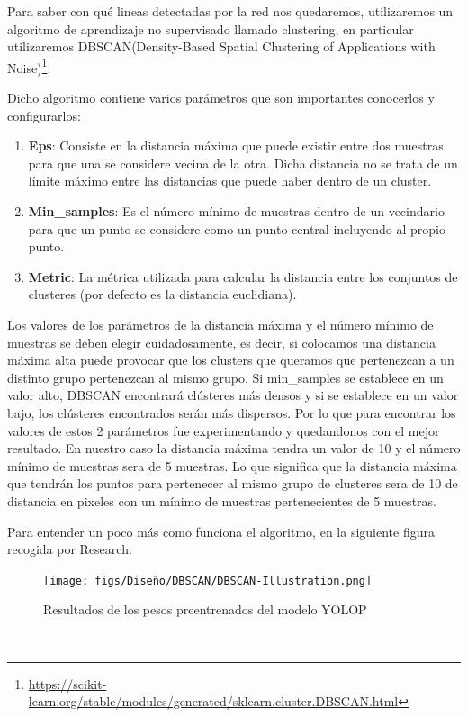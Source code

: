 Para saber con qué lineas detectadas por la red nos quedaremos, utilizaremos un algoritmo de aprendizaje no supervisado llamado clustering, en particular
utilizaremos DBSCAN(Density-Based Spatial Clustering of Applications with Noise)\footnote{\url{https://scikit-learn.org/stable/modules/generated/sklearn.cluster.DBSCAN.html}}. \newline

Dicho algoritmo contiene varios parámetros que son importantes conocerlos y configurarlos: 
\begin{enumerate}
  \item \textbf{Eps}: Consiste en la distancia máxima que puede existir entre dos muestras para que una se considere vecina de la otra. Dicha distancia no se trata de un límite 
  máximo entre las distancias que puede haber dentro de un cluster.
  \item \textbf{Min\_samples}: Es el número mínimo de muestras dentro de un vecindario para que un punto se considere como un punto central incluyendo al propio punto.
  \item \textbf{Metric}: La métrica utilizada para calcular la distancia entre los conjuntos de clusteres (por defecto es la distancia euclidiana). 
\end{enumerate}
Los valores de los parámetros de la distancia máxima y el número mínimo de muestras se deben elegir cuidadosamente, es decir, si colocamos una distancia 
máxima alta puede provocar que los clusters que queramos que pertenezcan a un distinto grupo pertenezcan al mismo grupo. 
Si min\_samples se establece en un valor alto, DBSCAN encontrará clústeres más densos y 
si se establece en un valor bajo, los clústeres encontrados serán más dispersos.
\break
Por lo que para encontrar los valores de estos 2 parámetros fue experimentando y quedandonos con el mejor resultado. En nuestro caso la distancia máxima tendra un valor de 10 
y el número mínimo de muestras sera de 5 muestras. Lo que significa que la distancia máxima que tendrán los puntos para pertenecer al mismo grupo de clusteres sera de 10 de distancia en pixeles
con un mínimo de muestras pertenecientes de 5 muestras. 

Para entender un poco más como funciona el algoritmo, en la siguiente figura recogida por Research: 

\begin{figure} [H]
  \begin{center}
    \texttt{[image: figs/Diseño/DBSCAN/DBSCAN-Illustration.png]}
  \end{center}
  \caption{Resultados de los pesos preentrenados del modelo YOLOP}
  \label{fig:pesos_preentrenados}
\end{figure}\

